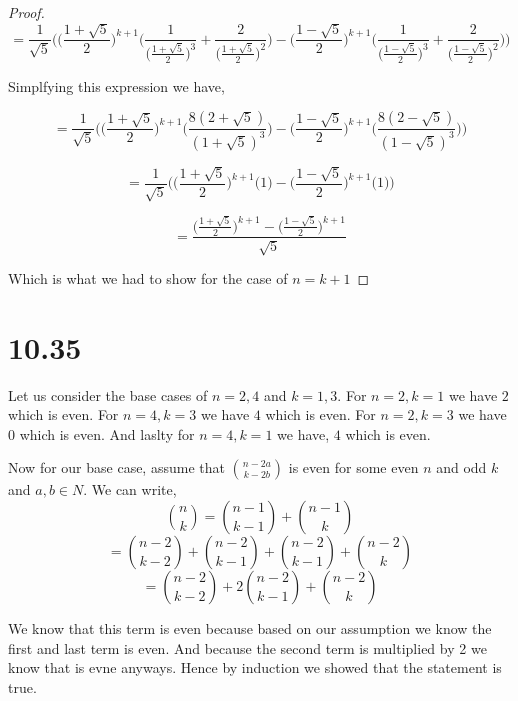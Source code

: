 \documentclass[a4paper]{report}
\begin{document}
\begin{proof}
    $$ = \frac{1}{\sqrt{5}}\bigg(   \bigg (\frac{1 + \sqrt{5}}{2} \bigg )^{k + 1} \bigg( \frac{1}{\bigg (\frac{1 + \sqrt{5}}{2} \bigg )^3}   + \frac{2}{\bigg (\frac{1 + \sqrt{5}}{2} \bigg )^{2}} \bigg) - \bigg (\frac{1 - \sqrt{5}}{2} \bigg )^{k + 1} \bigg( \frac{1}{\bigg (\frac{1 - \sqrt{5}}{2} \bigg )^3}   + \frac{2}{\bigg (\frac{1 - \sqrt{5}}{2} \bigg )^{2}} \bigg) \bigg) $$

    Simplfying this expression we have, 

    $$ = \frac{1}{\sqrt{5}}\bigg(   \bigg (\frac{1 + \sqrt{5}}{2} \bigg )^{k + 1} \bigg(\frac{8( 2 + \sqrt{5})}{(1 + \sqrt{5})^3} \bigg) - \bigg (\frac{1 - \sqrt{5}}{2} \bigg )^{k + 1} \bigg( \frac{8(2 - \sqrt{5})}{(1 - \sqrt{5})^{3}} \bigg) \bigg) $$

    $$ = \frac{1}{\sqrt{5}}\bigg(   \bigg (\frac{1 + \sqrt{5}}{2} \bigg )^{k + 1} \bigg(1\bigg) - \bigg (\frac{1 - \sqrt{5}}{2} \bigg )^{k + 1} \bigg( 1\bigg) \bigg) $$

    $$=  \frac{\big ( \frac{1 + \sqrt{5}}{2}\big)^{k + 1} - \big ( \frac{1 - \sqrt{5}}{2}\big)^{k + 1}}{\sqrt{5}}$$

    Which is what we had to show for the case of $n = k + 1$

\end{proof}

\section*{10.35}

Let us consider the base cases of  $n = 2, 4$ and $k = 1,3$. For $n=2,k=1$ we have  $2$ which is even. For  $n = 4, k = 3$ we have  $4$ which is even. For $n = 2, k = 3$ we have 0 which is even. And laslty for $n = 4, k = 1$ we have,  $4$ which is even.

Now for our base case, assume that ${n - 2a\choose k - 2b}$ is even for some even  $n$ and odd $k$ and $a,b \in N$. We can write,  
$$ {n \choose k} = {n - 1 \choose k - 1} + {n - 1 \choose k}$$ 
$$ = {n - 2 \choose k - 2} + {n -2 \choose k- 1} + {n - 2 \choose k - 1} + {n-2 \choose k}$$ 
$$ = {n - 2 \choose k - 2} + 2{n -2 \choose k- 1}+ {n-2 \choose k}$$ 


We know that this term is even because based on our assumption we know the first and last term is even. And because the second term is multiplied by 2 we know that is evne anyways. Hence by induction we showed that the statement is true.











$$  $$ 
\end{document}
